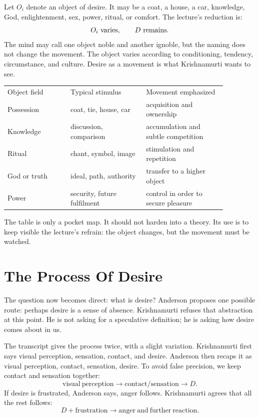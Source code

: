 Let \(O_i\) denote an object of desire. It may be a coat, a house, a car, knowledge, God, enlightenment, sex, power, ritual, or comfort. The lecture's reduction is:
\begin{equation}
O_i \ \hbox{varies},
\qquad
D \ \hbox{remains}.
\end{equation}
The mind may call one object noble and another ignoble, but the naming does not change the movement. The object varies according to conditioning, tendency, circumstance, and culture. Desire as a movement is what Krishnamurti wants to see.

\begin{table}
\centering
\begin{tabular}{p{0.25\linewidth}p{0.30\linewidth}p{0.32\linewidth}}
Object field & Typical stimulus & Movement emphasized \\
Possession & coat, tie, house, car & acquisition and ownership \\
Knowledge & discussion, comparison & accumulation and subtle competition \\
Ritual & chant, symbol, image & stimulation and repetition \\
God or truth & ideal, path, authority & transfer to a higher object \\
Power & security, future fulfilment & control in order to secure pleasure
\end{tabular}
\end{table}

The table is only a pocket map. It should not harden into a theory. Its use is to keep visible the lecture's refrain: the object changes, but the movement must be watched.

\section{The Process Of Desire}

The question now becomes direct: what is desire? Anderson proposes one possible route: perhaps desire is a sense of absence. Krishnamurti refuses that abstraction at this point. He is not asking for a speculative definition; he is asking how desire comes about in us.

The transcript gives the process twice, with a slight variation. Krishnamurti first says visual perception, sensation, contact, and desire. Anderson then recaps it as visual perception, contact, sensation, desire. To avoid false precision, we keep contact and sensation together:
\begin{equation}
\mathrm{visual\ perception}
\longrightarrow
\mathrm{contact/sensation}
\longrightarrow
D.
\end{equation}
If desire is frustrated, Anderson says, anger follows. Krishnamurti agrees that all the rest follows:
\begin{equation}
D + \mathrm{frustration}
\longrightarrow
\mathrm{anger\ and\ further\ reaction}.
\end{equation}

